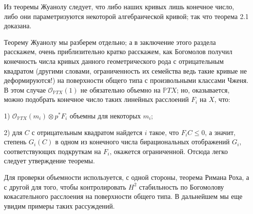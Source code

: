 \medskip
Из теоремы Жуанолу следует, что либо наших кривых лишь  конечное число, либо они
параметризуются некоторой алгебраической кривой; так что теорема 2.1 доказана.


Теорему Жуанолу мы разберем отдельно; а в заключение этого раздела расскажем, очень приблизительно
кратко расскажем, как Богомолов получил конечность числа кривых данного
геометрического рода с отрицательным квадратом
(другими словами, ограниченность их семейства
ведь такие кривые не деформируются!) на поверхности общего типа с
произвольными классами Чженя. В этом случае $\mathcal{O}_{\mathbb{P} TX}(1)$ не
обязательно объемно на ${\mathbb{P} TX}$; но, оказывается, можно подобрать
конечное число таких линейных расслоений $F_i$ на $X$, что:

1) $\mathcal{O}_{\mathbb{P} TX}(m_i)\otimes p^*F_i$ объемны для некоторых $m_i$;

2) для $C$ с отрицательным квадратом найдется $i$ такое, что $F_iC\leq 0$, а значит, степень $G_i(C)$ в одном из
конечного числа бирациональных отображений $G_i$, соответствующих подкруткам на $F_i$, окажется ограниченной. Отсюда легко
следует утверждение теоремы.


Для проверки объемности используется, с одной стороны,
теорема Римана Роха, а с другой для того, чтобы контролировать
$H^2$ стабильность по Богомолову кокасательного расслоения
на поверхности общего типа. В дальнейшем мы еще увидим примеры
таких рассуждений.
